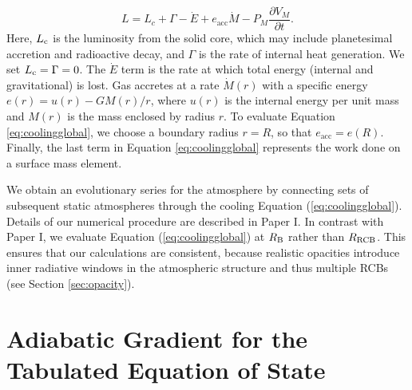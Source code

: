 \begin{equation}
\label{eq:coolingglobal}
L=L_c+\Gamma-\dot{E}+e_{\mathrm{acc}}\dot{M}-P_M \frac{\partial V_M}{\partial t}.
\end{equation}
Here, $L_{\rm c}$ is the luminosity from the solid core, which may include planetesimal accretion and radioactive decay, and $\Gamma$ is the rate of internal heat generation. We set $L_{\rm c}=\Gamma=0$. The $\dot{E}$ term is the rate at which total energy (internal and gravitational) is lost.  Gas accretes at a rate  $\dot{M}(r)$ with a specific energy $e(r)=u(r) - G M(r) / r$, where $u(r)$ is the internal energy per unit mass and $M(r)$ is the mass enclosed by radius $r$. To evaluate Equation \ref{eq:coolingglobal}, we choose a boundary radius $r=R$, so that  $e_{\mathrm{acc}} = e(R)$.
Finally, the last term in Equation \ref{eq:coolingglobal} represents the work done on a surface mass element. 



We obtain an evolutionary series for the atmosphere by connecting sets of subsequent static atmospheres through the cooling Equation (\ref{eq:coolingglobal}). Details of our numerical procedure are described in Paper I. In contrast with Paper I, we evaluate Equation (\ref{eq:coolingglobal}) at $R_{\rm B}$ rather than $R_{\rm RCB}$. This ensures that our calculations are consistent,  because realistic opacities introduce inner radiative windows in the atmospheric structure and thus multiple RCBs (see Section \ref{sec:opacity}). 



\section{Adiabatic Gradient for the Tabulated Equation of State}
\label{deladtable}


